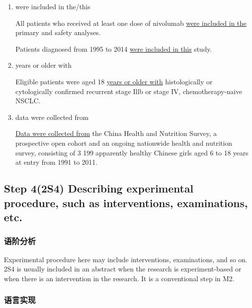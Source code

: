 \documentclass[a4paper]{ctexbook}
\begin{document}
    \begin{enumerate}
      \item were included in the/this
      \begin{eg}{}
        All patients who received at least one dose of nivolumab \uline{were included in the} primary and safety analyses.
      \end{eg}
        
      \begin{eg}{}
        Patients diagnosed from 1995 to 2014 \uline{were included in this} study.
      \end{eg}

      \item years or older with
      \begin{eg}{}
        Eligible patients were aged 18 \uline{years or older with} histologically or cytologically confirmed recurrent stage Illb or stage IV, chemotherapy-naive NSCLC.
      \end{eg}

      \item data were collected from
      \begin{eg}{}
        \uline{Data were collected from} the China Health and Nutrition Survey, a prospective open cohort and an ongoing nationwide health and nutrition survey, consisting of 3 199 apparently healthy Chinese girls aged 6 to 18 years at entry from 1991 to 2011.
      \end{eg}
    \end{enumerate}

  \subsection{Step 4(2S4) Describing experimental procedure, such as interventions, examinations, etc.}

    \subsubsection{语阶分析}

    Experimental procedure here may include interventions, examinations, and so on. 2S4 is usually included in an abstract when the research is experiment-based or when there is an intervention in the research. It is a conventional step in M2.

    \subsubsection{语言实现}
\end{document}
